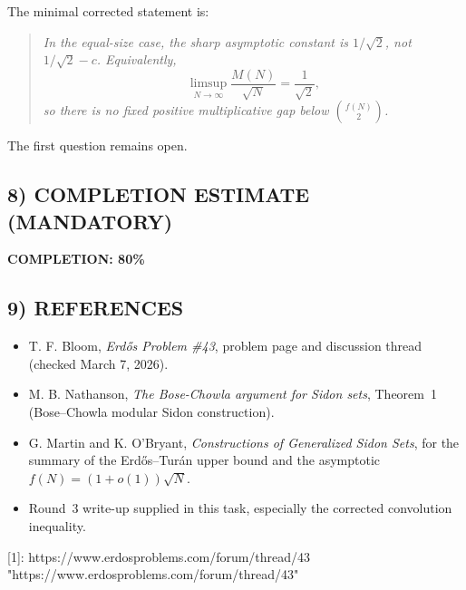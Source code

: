 The minimal corrected statement is:
\begin{quote}
\emph{In the equal-size case, the sharp asymptotic constant is $1/\sqrt2$, not $1/\sqrt2-c$.  Equivalently,}
\[
\limsup_{N\to\infty}\frac{M(N)}{\sqrt N}=\frac1{\sqrt2},
\]
\emph{so there is no fixed positive multiplicative gap below $\binom{f(N)}{2}$.}
\end{quote}

The first question remains open.

\subsection{8) COMPLETION ESTIMATE (MANDATORY)}

\textbf{COMPLETION: 80\%}

\subsection{9) REFERENCES}

\begin{itemize}
\item T. F. Bloom, \emph{Erd\H{o}s Problem \#43}, problem page and discussion thread (checked March 7, 2026).
\item M. B. Nathanson, \emph{The Bose-Chowla argument for Sidon sets}, Theorem~1 (Bose--Chowla modular Sidon construction).
\item G. Martin and K. O'Bryant, \emph{Constructions of Generalized Sidon Sets}, for the summary of the Erd\H{o}s--Tur\'an upper bound and the asymptotic $f(N)=(1+o(1))\sqrt N$.
\item Round~3 write-up supplied in this task, especially the corrected convolution inequality.
\end{itemize}

[1]: https://www.erdosproblems.com/forum/thread/43 "https://www.erdosproblems.com/forum/thread/43"